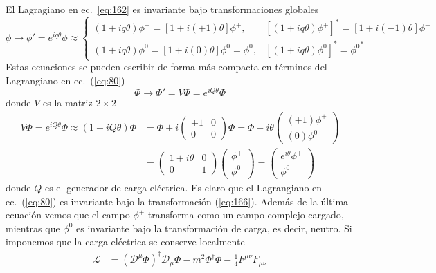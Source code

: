 El Lagragiano en ec.~\eqref{eq:162} es invariante bajo transformaciones globales
\begin{equation}
  \phi\to\phi'=e^{iq\theta}\phi\approx
  \begin{cases}
    (1+iq\theta)\phi^+=[1+i(+1)\theta]\phi^+,&[(1+iq\theta)\phi^+]^*=[1+i(-1)\theta]\phi^-\\
    (1+iq\theta)\phi^0=[1+i(0)\theta]\phi^0=\phi^0,&[(1+iq\theta)\phi^0]^*={\phi^0}^*
  \end{cases}
\end{equation}
Estas ecuaciones se pueden escribir de forma m\'as compacta en t\'erminos del Lagrangiano en ec.~(\ref{eq:80})
\begin{equation}
  \label{eq:166}
  \Phi\to \Phi'=V\Phi=e^{iQ\theta}\Phi
\end{equation}
donde $V$ es la matriz $2\times2$ 
\begin{align}
\label{eq:252}
  V\Phi=e^{iQ\theta}\Phi\approx(1+iQ\theta)\Phi&=\Phi+i\begin{pmatrix}
    +1&0\\
    0&0
  \end{pmatrix}\Phi=\Phi+i\theta\begin{pmatrix}
    (+1)\phi^+\\
    (0)\phi^0
  \end{pmatrix}\nonumber\\
  &=\begin{pmatrix}
    1+i\theta&0\\
    0&1
  \end{pmatrix}
  \begin{pmatrix}
    \phi^+\\
    \phi^0
  \end{pmatrix}
=\begin{pmatrix}
    e^{i \theta }\phi^+\\
    \phi^0
  \end{pmatrix}
\end{align}
donde $Q$ es el generador de carga el\'ectrica. Es claro que el Lagrangiano en ec.~(\ref{eq:80}) es invariante bajo la transformaci\'on (\ref{eq:166}). Adem\'as de la \'ultima ecuaci\'on vemos que el campo $\phi^+$ transforma como un campo complejo cargado, mientras que $\phi^0$ es invariante bajo la transformaci\'on de carga, es decir, neutro. Si imponemos que la carga el\'ectrica se conserve localmente
\begin{align}
  \mathcal{L}&=\left(\mathcal{D}^\mu\Phi\right)^\dagger\mathcal{D}_\mu\Phi-m^2\Phi^\dagger \Phi-\tfrac{1}{4}F^{\mu\nu}F_{\mu\nu}
\end{align}
